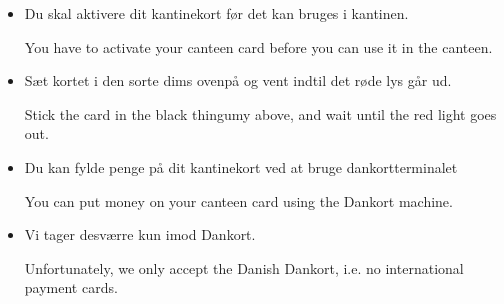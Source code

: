 \documentclass{article}
\begin{document}

\maketitle

\null

\vspace{-1.7cm}

\huge


\vspace{-1cm}

\begin{itemize}

\dansk

\item Du skal aktivere dit kantinekort før det kan bruges i kantinen.

\english You have to activate your canteen card before you can use it in the
canteen.

\dansk

\item Sæt kortet i den sorte dims ovenpå og vent indtil det røde lys går ud.

\english Stick the card in the black thingumy above, and wait until the red
light goes out.

\end{itemize}


\vspace{-1cm}

\begin{itemize}

\dansk

\item Du kan fylde penge på dit kantinekort ved at bruge dankortterminalet

\english You can put money on your canteen card using the Dankort machine. \dansk

\item Vi tager desværre kun imod Dankort.

\english

Unfortunately, we only accept the Danish Dankort, i.e. no international payment
cards.

\end{itemize}

\dansk

\underskriv
\end{document}
